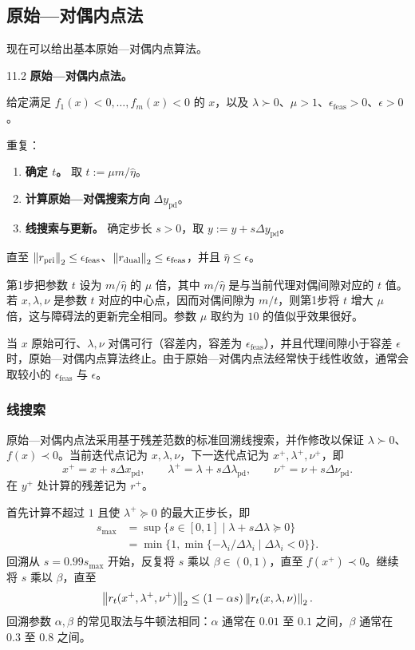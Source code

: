 \subsection{原始—对偶内点法}
现在可以给出基本原始—对偶内点算法。

\begin{origalgorithm}{11.2}
\textbf{原始—对偶内点法。}

给定满足 $f_1(x)<0,\ldots,f_m(x)<0$ 的 $x$，以及 $\lambda\succ0$、$\mu>1$、$\epsilon_{\mathrm{feas}}>0$、$\epsilon>0$。

重复：
\begin{enumerate}
\item \textbf{确定 $t$。} 取 $t:=\mu m/\widehat\eta$。
\item \textbf{计算原始—对偶搜索方向} $\Delta y_{\mathrm{pd}}$。
\item \textbf{线搜索与更新。} 确定步长 $s>0$，取 $y:=y+s\Delta y_{\mathrm{pd}}$。
\end{enumerate}
直至 $\left\lVert r_{\mathrm{pri}}\right\rVert_2\le\epsilon_{\mathrm{feas}}$、$\left\lVert r_{\mathrm{dual}}\right\rVert_2\le\epsilon_{\mathrm{feas}}$，并且 $\widehat\eta\le\epsilon$。
\end{origalgorithm}
第1步把参数 $t$ 设为 $m/\widehat\eta$ 的 $\mu$ 倍，其中 $m/\widehat\eta$ 是与当前代理对偶间隙对应的 $t$ 值。若 $x,\lambda,\nu$ 是参数 $t$ 对应的中心点，因而对偶间隙为 $m/t$，则第1步将 $t$ 增大 $\mu$ 倍，这与障碍法的更新完全相同。参数 $\mu$ 取约为 $10$ 的值似乎效果很好。

当 $x$ 原始可行、$\lambda,\nu$ 对偶可行（容差内，容差为 $\epsilon_{\mathrm{feas}}$），并且代理间隙小于容差 $\epsilon$ 时，原始—对偶内点算法终止。由于原始—对偶内点法经常快于线性收敛，通常会取较小的 $\epsilon_{\mathrm{feas}}$ 与 $\epsilon$。

\subsubsection*{线搜索}
原始—对偶内点法采用基于残差范数的标准回溯线搜索，并作修改以保证 $\lambda\succ0$、$f(x)\prec0$。当前迭代点记为 $x,\lambda,\nu$，下一迭代点记为 $x^+,\lambda^+,\nu^+$，即
\[
x^+=x+s\Delta x_{\mathrm{pd}},\qquad
\lambda^+=\lambda+s\Delta\lambda_{\mathrm{pd}},\qquad
\nu^+=\nu+s\Delta\nu_{\mathrm{pd}}.
\]
在 $y^+$ 处计算的残差记为 $r^+$。

首先计算不超过 $1$ 且使 $\lambda^+\succeq0$ 的最大正步长，即
\begin{align*}
s_{\mathrm{max}}&=\sup\{s\in[0,1]\mid\lambda+s\Delta\lambda\succeq0\}\\
&=\min\bigl\{1,\min\{-\lambda_i/\Delta\lambda_i\mid\Delta\lambda_i<0\}\bigr\}.
\end{align*}
回溯从 $s=0.99s_{\mathrm{max}}$ 开始，反复将 $s$ 乘以 $\beta\in(0,1)$，直至 $f(x^+)\prec0$。继续将 $s$ 乘以 $\beta$，直至
\[
\left\lVert r_t(x^+,\lambda^+,\nu^+)\right\rVert_2\le(1-\alpha s)\left\lVert r_t(x,\lambda,\nu)\right\rVert_2.
\]
回溯参数 $\alpha,\beta$ 的常见取法与牛顿法相同：$\alpha$ 通常在 $0.01$ 至 $0.1$ 之间，$\beta$ 通常在 $0.3$ 至 $0.8$ 之间。


